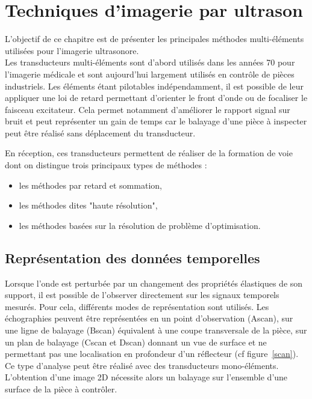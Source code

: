 \chapter{Techniques d'imagerie par ultrason}

 L'objectif de ce chapitre est de présenter les principales méthodes multi-éléments utilisées pour l'imagerie ultrasonore. \\

Les transducteurs multi-éléments sont d'abord utilisés dans les années 70 pour l'imagerie médicale et sont aujourd'hui largement utilisés en contrôle de pièces industriels. Les éléments étant pilotables indépendamment, il est possible de leur appliquer une loi de retard permettant d'orienter le front d'onde ou de focaliser le faisceau excitateur. Cela permet notamment d'améliorer le rapport signal sur bruit et peut représenter un gain de temps car le balayage d'une pièce à inspecter peut être réalisé sans déplacement du transducteur.

En réception, ces transducteurs permettent de réaliser de la formation de voie dont on distingue trois principaux types de méthodes : 
\begin{itemize}
	\item les méthodes par retard et sommation,
	\item les méthodes dites "haute résolution",
	\item les méthodes basées sur la résolution de problème d'optimisation.
\end{itemize} 


\section{Représentation des données temporelles}

Lorsque l'onde est perturbée par un changement des propriétés élastiques de son support, il est possible de l'observer directement sur les signaux temporels mesurés. Pour cela, différents modes de représentation sont utilisés. Les échographies peuvent être représentées en un point d'observation (Ascan), sur une ligne de balayage (Bscan) équivalent à une coupe transversale de la pièce,  sur un plan de balayage (Cscan et Dscan) donnant un vue de surface et ne permettant pas une localisation en profondeur d'un réflecteur (cf figure~\ref{scan}).\\
 
Ce type d'analyse peut être réalisé avec des transducteurs mono-éléments. L'obtention d'une image 2D nécessite alors un balayage sur l'ensemble d'une surface de la pièce à contrôler. 

